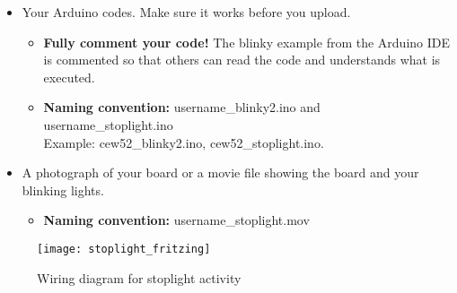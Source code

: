 \documentclass[10pt]{article}
\begin{document}
\begin{itemize}
	\item Your Arduino codes. Make sure it works before you upload.
	\begin{itemize}
		\item \textbf{Fully comment your code!} The blinky example from the Arduino IDE is commented so that others can read the code and understands what is executed. 
		\item \textbf{Naming convention:} username\_blinky2.ino and username\_stoplight.ino\\
		Example: cew52\_blinky2.ino, cew52\_stoplight.ino.
	\end{itemize}

	\item A photograph of your board or a movie file showing the board and your blinking lights.
	\begin{itemize}
		\item \textbf{Naming convention:} username\_stoplight.mov
	\end{itemize}
\end{itemize}

\vspace{2cm}

\begin{figure}[ht]
	\centering
	\texttt{[image: stoplight\_fritzing]}
	\caption{Wiring diagram for stoplight activity}
	\label{fig:stoplight_wiring_diagram}
\end{figure}
\end{document}
